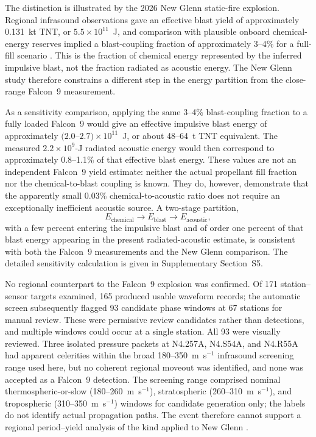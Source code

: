 \documentclass[]{seismica}
\begin{document}
The distinction is illustrated by the 2026 New Glenn static-fire explosion.
Regional infrasound observations gave an effective blast yield of approximately
0.131~kt TNT, or $5.5\times10^{11}$~J, and comparison with plausible onboard
chemical-energy reserves implied a blast-coupling fraction of approximately
3--4\% for a full-fill scenario
\citep{silber_scamfer_newglenn_2026}. This is the fraction of chemical energy
represented by the inferred impulsive blast, not the fraction radiated as
acoustic energy. The New Glenn study therefore constrains a different step in
the energy partition from the close-range Falcon~9 measurement.

As a sensitivity comparison, applying the same 3--4\% blast-coupling fraction
to a fully loaded Falcon~9 would give an effective impulsive blast energy of
approximately $(2.0$--$2.7)\times10^{11}$~J, or about 48--64~t TNT
equivalent. The measured $2.2\times10^9$-J radiated acoustic energy would then
correspond to approximately 0.8--1.1\% of that effective blast energy. These
values are not an independent Falcon~9 yield estimate: neither the actual
propellant fill fraction nor the chemical-to-blast coupling is known. They do,
however, demonstrate that the apparently small 0.03\% chemical-to-acoustic
ratio does not require an exceptionally inefficient acoustic source. A
two-stage partition,
\[
 E_{\mathrm{chemical}}
 \rightarrow E_{\mathrm{blast}}
 \rightarrow E_{\mathrm{acoustic}},
\]
with a few percent entering the impulsive blast and of order one percent of
that blast energy appearing in the present radiated-acoustic estimate, is
consistent with both the Falcon~9 measurements and the New Glenn comparison.
The detailed sensitivity calculation is given in Supplementary Section~S5.

No regional counterpart to the Falcon~9 explosion was confirmed. Of 171
station--sensor targets examined, 165 produced usable waveform records; the
automatic screen subsequently flagged 93 candidate phase windows at 67
stations for manual review. These were permissive review candidates rather
than detections, and multiple windows could occur at a single station. All 93
were visually reviewed. Three isolated pressure packets at N4.257A, N4.S54A,
and N4.R55A had apparent celerities within the broad 180--350~m~s$^{-1}$
infrasound screening range used here, but no coherent regional moveout was
identified, and none was accepted as a Falcon~9 detection. The screening
range comprised nominal thermospheric-or-slow (180--260~m~s$^{-1}$),
stratospheric (260--310~m~s$^{-1}$), and tropospheric
(310--350~m~s$^{-1}$) windows for candidate generation only; the labels do
not identify actual propagation paths. The event therefore cannot support a regional
period--yield analysis of the kind applied to New Glenn
\citep{silber_scamfer_newglenn_2026}.
\end{document}
